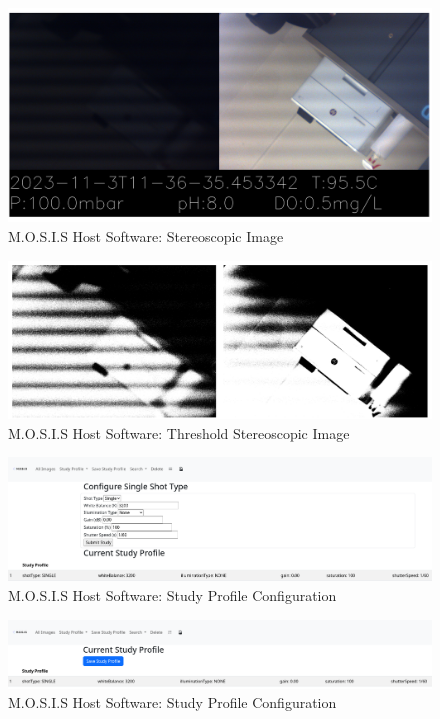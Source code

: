 \documentclass[12pt]{article}
\begin{document}
\begin{figure}[H]
	\includegraphics[width=\textwidth]{Figures/tagged_stereoscopic_image.png}
	\caption{M.O.S.I.S Host Software: Stereoscopic Image}
\end{figure}
\begin{figure}[H]
	\includegraphics[width=\textwidth]{Figures/threshold_image.png}
	\caption{M.O.S.I.S Host Software: Threshold Stereoscopic Image}
\end{figure}
\begin{figure}[H]
	\includegraphics[width=\textwidth]{Figures/study_profile_configuration.png}
	\caption{M.O.S.I.S Host Software: Study Profile Configuration}
\end{figure}
\begin{figure}[H]
	\includegraphics[width=\textwidth]{Figures/study_profile_save.png}
	\caption{M.O.S.I.S Host Software: Study Profile Configuration}
\end{figure}
\end{document}

